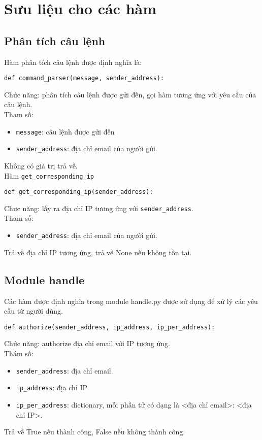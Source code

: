 \section{Sưu liệu cho các hàm}
\subsection{Phân tích câu lệnh}
Hàm phân tích câu lệnh được định nghĩa là:
\begin{lstlisting}
def command_parser(message, sender_address):
\end{lstlisting}
Chức năng: phân tích câu lệnh được gửi đến, gọi hàm tương ứng với yêu cầu của câu lệnh.\\
Tham số:
\begin{itemize}
\item \lstinline{message}: câu lệnh được gửi đến
\item \lstinline{sender_address}: địa chỉ email của người gửi.
\end{itemize}
Không có giá trị trả về.\\

Hàm \lstinline{get_corresponding_ip}
\begin{lstlisting}
def get_corresponding_ip(sender_address):
\end{lstlisting}
Chưc năng: lấy ra địa chỉ IP tương ứng với \lstinline{sender_address}.\\
Tham số:
\begin{itemize}
\item \lstinline{sender_address}: địa chỉ email của người gửi.
\end{itemize}
Trả về địa chỉ IP tương ứng, trả về None nếu không tồn tại.

\subsection{Module handle}
Các hàm được định nghĩa trong module handle.py được sử dụng để xử lý các yêu cầu từ người dùng.
\begin{lstlisting}
def authorize(sender_address, ip_address, ip_per_address):
\end{lstlisting}
Chức năng: authorize địa chỉ email với IP tương ứng.\\
Thám số: 
\begin{itemize}
\item \lstinline{sender_address}: địa chỉ email.
\item \lstinline{ip_address}: địa chỉ IP
\item \lstinline{ip_per_address}: dictionary, mỗi phần tử có dạng là <địa chỉ email>: <địa chỉ IP>.
\end{itemize}
Trả về True nếu thành công, False nếu không thành công.

